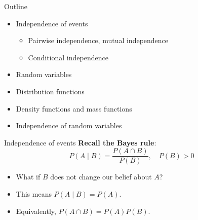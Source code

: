 \documentclass [aspectratio=169]{beamer}
\begin{document}
\begin{frame}{Outline}
    \begin{itemize}
    	\item Independence of events %
    	\begin{itemize}
    	    \item Pairwise independence, mutual independence
    	    \item Conditional independence 
    	\end{itemize}
        \item Random variables
        \item Distribution functions
        \item Density functions and mass functions
        \item Independence of random variables
    \end{itemize}




\end{frame}

\begin{frame}{Independence of events}
\textbf{Recall the Bayes rule}:\\
$$P(A \mid B) = \dfrac{P(A\cap B)}{P(B)}, \quad P(B) > 0$$
\begin{itemize}
    \item<1-> What if $B$ does not change our belief about $A$?
    \item<2-> This means $P(A \mid B) = P(A)$.
    \item<3-> Equivalently, $P(A \cap B) = P(A)P(B)$.
\end{itemize}
\vspace{0.2in}
\end{frame}
\end{document}
